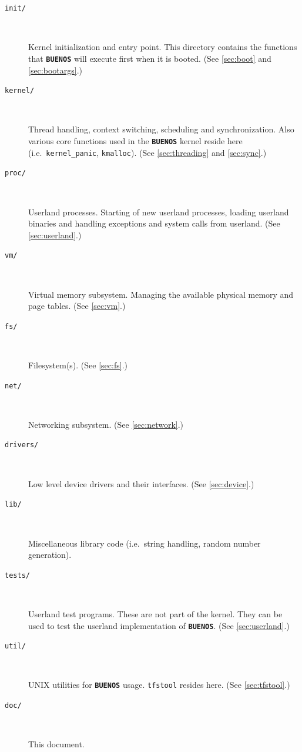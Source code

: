 \documentclass[twoside,a4paper]{report}
\newcommand{\buenos}{\texttt{\textbf{BUENOS}}}
\begin{document}
\begin{description}

\item[\texttt{init/}]~

Kernel initialization and entry point. This directory contains the
functions that \buenos{} will execute first when it is booted. (See
\autoref{sec:boot} and \autoref{sec:bootargs}.)

\item[\texttt{kernel/}]~

Thread handling, context switching, scheduling and
synchronization. Also various core functions used in the \buenos{}
kernel reside here (i.e.\ \texttt{kernel\_panic}, \texttt{kmalloc}).
(See \autoref{sec:threading} and \autoref{sec:sync}.)

\item[\texttt{proc/}]~

Userland processes. Starting of new userland processes, loading
userland binaries and handling exceptions and system calls from
userland. (See \autoref{sec:userland}.)

\item[\texttt{vm/}]~

Virtual memory subsystem. Managing the available physical memory and
page tables. (See \autoref{sec:vm}.)

\item[\texttt{fs/}]~

Filesystem(s). (See \autoref{sec:fs}.)

\item[\texttt{net/}]~

Networking subsystem. (See \autoref{sec:network}.)

\item[\texttt{drivers/}]~

Low level device drivers and their interfaces. (See
\autoref{sec:device}.)

\item[\texttt{lib/}]~

Miscellaneous library code (i.e.\ string handling, random number
generation).

\item[\texttt{tests/}]~

Userland test programs. These are not part of the kernel. They can be
used to test the userland implementation of \buenos{}. (See
\autoref{sec:userland}.)

\item[\texttt{util/}]~

UNIX utilities for \buenos{} usage. \texttt{tfstool} resides
here. (See \autoref{sec:tfstool}.)

\item[\texttt{doc/}]~

This document.

\end{description}
\end{document}
